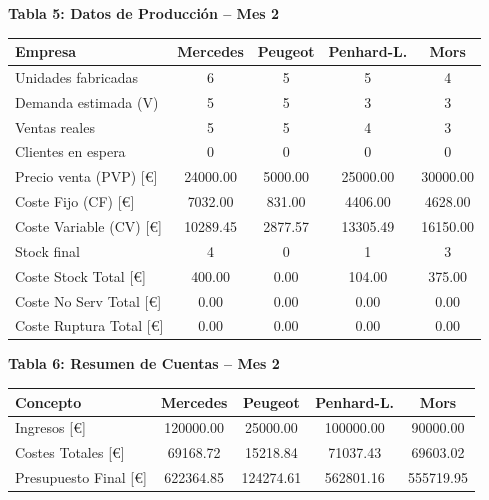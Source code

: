 \documentclass{standalone}
\begin{document}
	\begin{minipage}{1.08\textwidth} %
		\centering
		
		
		\textbf{Tabla 5: Datos de Producción – Mes 2}\\[0.5pt]
		\begin{tabular}{@{}l
				S[table-format=5.2]
				S[table-format=4.2]
				S[table-format=5.2]
				S[table-format=5.2]@{}}
			\toprule
			\textbf{Empresa} & \textbf{Mercedes} & \textbf{Peugeot} & \textbf{Penhard-L.} & \textbf{Mors} \\
			\midrule
			Unidades fabricadas & 6 & 5 & 5 & 4 \\
			Demanda estimada (V) & 5 & 5 & 3 & 3 \\
			Ventas reales & 5 & 5 & 4 & 3 \\
			Clientes en espera & 0 & 0 & 0 & 0 \\
			Precio venta (PVP) [\euro] & 24000.00 & 5000.00 & 25000.00 & 30000.00 \\
			Coste Fijo (CF) [\euro] & 7032.00 & 831.00 & 4406.00 & 4628.00 \\
			Coste Variable (CV) [\euro] & 10289.45 & 2877.57 & 13305.49 & 16150.00 \\
			Stock final & 4 & 0 & 1 & 3 \\
			Coste Stock Total [\euro] & 400.00 & 0.00 & 104.00 & 375.00 \\
			Coste No Serv Total [\euro] & 0.00 & 0.00 & 0.00 & 0.00 \\
			Coste Ruptura Total [\euro] & 0.00 & 0.00 & 0.00 & 0.00 \\
			\bottomrule
		\end{tabular}
		
		\vspace{2em} %
		
		\textbf{Tabla 6: Resumen de Cuentas – Mes 2}\\[0.5pt]
		\begin{tabular}{@{}l
				S[table-format=7.2]
				S[table-format=7.2]
				S[table-format=7.2]
				S[table-format=7.2]@{}} %
				\toprule
				\textbf{Concepto} & \textbf{Mercedes} & \textbf{Peugeot} & \textbf{Penhard-L.} & \textbf{Mors} \\
				\midrule
				Ingresos [\euro] & 120000.00 & 25000.00 & 100000.00 & 90000.00 \\
				Costes Totales [\euro] & 69168.72 & 15218.84 & 71037.43 & 69603.02 \\
				Presupuesto Final [\euro] & 622364.85 & 124274.61 & 562801.16 & 555719.95 \\
				\bottomrule
			\end{tabular}
		\end{minipage}
	
\end{document}
